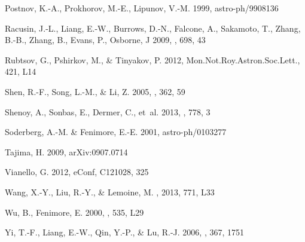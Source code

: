 \documentclass[manuscript]{aastex}
\begin{document}
\begin{thebibliography}{}
Postnov, K.-A., Prokhorov, M.-E., Lipunov, V.-M. 1999, astro-ph/9908136

Racusin, J.-L., Liang, E.-W., Burrows, D.-N., Falcone, A., Sakamoto, T., Zhang, B.-B., Zhang, B., Evans, P., Osborne, J 2009, \apj, 698, 43

Rubtsov, G., Pshirkov, M., \& Tinyakov, P. 2012, Mon.Not.Roy.Astron.Soc.Lett.,
  421, L14

Shen, R.-F., Song, L.-M., \& Li, Z. 2005, \mnras, 362, 59

Shenoy, A., Sonbas, E., Dermer, C., {et~al.} 2013, \apj, 778, 3

Soderberg, A.-M. \& Fenimore, E.-E. 2001, astro-ph/0103277

Tajima, H. 2009, arXiv:0907.0714

Vianello, G. 2012, eConf, C121028, 325

Wang, X.-Y., Liu, R.-Y., \& Lemoine, M. \apj, 2013, 771, L33

Wu, B., Fenimore, E. 2000, \apj, 535, L29

Yi, T.-F., Liang, E.-W., Qin, Y.-P., \& Lu, R.-J. 2006,
  \mnras, 367, 1751

\end{thebibliography}
\end{document}
